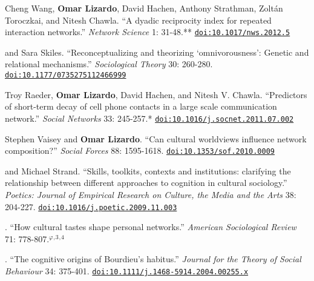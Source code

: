 \documentclass[10pt]{article}
\begin{document}
\ind Cheng Wang, {\bf Omar Lizardo}, David Hachen, Anthony Strathman, Zolt\'{a}n Toroczkai, and Nitesh Chawla. ``A dyadic reciprocity index for repeated interaction networks.'' {\em Network Science} 1: 31-48.\textcolor{uclablue}{**} \href{https://doi.org/10.1017/nws.2012.5}{\nolinkurl{doi:10.1017/nws.2012.5}}


 and Sara Skiles. ``Reconceptualizing and theorizing ‘omnivorousness’: Genetic and relational mechanisms.'' {\em Sociological Theory} 30: 260-280. \href{https://doi.org/10.1177/0735275112466999}{\nolinkurl{doi:10.1177/0735275112466999}}


\ind Troy Raeder, {\bf Omar Lizardo}, David Hachen, and Nitesh V. Chawla. ``Predictors of short-term decay of cell phone contacts in a large scale communication network.'' {\em Social Networks} 33: 245-257.\textcolor{uclablue}{*} \href{https://doi.org/10.1016/j.socnet.2011.07.002}{\nolinkurl{doi:10.1016/j.socnet.2011.07.002}}

\ind Stephen Vaisey and {\bf Omar Lizardo}. ``Can cultural worldviews influence network composition?''  {\em Social Forces} 88: 1595-1618. \href{https://doi.org/10.1353/sof.2010.0009}{\nolinkurl{doi:10.1353/sof.2010.0009}}

 and Michael Strand. ``Skills, toolkits, contexts and institutions: clarifying the relationship between different approaches to  cognition in cultural sociology.''  {\em Poetics: Journal of Empirical Research on Culture, the Media and the Arts} 38: 204-227. \href{https://doi.org/10.1016/j.poetic.2009.11.003}{\nolinkurl{doi:10.1016/j.poetic.2009.11.003}}

. ``How cultural tastes shape personal networks.'' {\em American Sociological Review} 71:  778-807.\textcolor{black}{$^{\varphi}$}$^{,}$\textcolor{uclablue}{$^{3}$}$^{,}$\textcolor{uclablue}{$^{4}$}

. ``The cognitive origins of Bourdieu's habitus.'' {\em Journal for the Theory of Social Behaviour} 34: 375-401. \href{https://doi.org/10.1111/j.1468-5914.2004.00255.x}{\nolinkurl{doi:10.1111/j.1468-5914.2004.00255.x}}

\bigskip
{}
    
    
    
\end{document}
